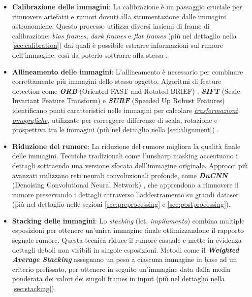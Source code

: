 \begin{itemize}
\item \textbf{Calibrazione delle immagini}: La calibrazione è un passaggio cruciale per rimuovere artefatti e rumori dovuti alla strumentazione dalle immagini astronomiche. Questo processo utilizza diversi insiemi di frame di calibrazione: \textit{bias frames, dark frames} e \textit{flat frames} (più nel dettaglio nella \cref{sec:calibration}) dai quali è possibile estrarre informazioni sul rumore dell'immagine, così da poterlo sottrarre alla stessa \cite{calibration}.

\item \textbf{Allineamento delle immagini}: L'allineamento è necessario per combinare correttamente più immagini dello stesso oggetto. Algoritmi di feature detection come \textit{\textbf{ORB}} (Oriented FAST and Rotated BRIEF) \cite{orb}, \textit{\textbf{SIFT}} (Scale-Invariant Feature Transform) e \textit{\textbf{SURF}} (Speeded Up Robust Features) identificano punti caratteristici nelle immagini per calcolare \hyperref[subsec:homography]{\textit{trasformazioni omografiche}}, utilizzate per correggere differenze di scala, rotazione e prospettiva tra le immagini (più nel dettaglio nella \cref{sec:alignment}) \cite{multiwavelength_image_proc} \cite{improved_solan}.

\item \textbf{Riduzione del rumore}: La riduzione del rumore migliora la qualità finale delle immagini. Tecniche tradizionali come l'unsharp masking \cite{multiwavelength_image_proc} accentuano i dettagli sottraendo una versione sfocata dell'immagine originale. Approcci più avanzati utilizzano reti neurali convoluzionali profonde, come \textit{\textbf{DnCNN}} (Denoising Convolutional Neural Network) \cite{DnCnn}, che apprendono a rimuovere il rumore preservando i dettagli attraverso l'addestramento su grandi dataset (più nel dettaglio nelle sezioni \ref{sec:preprocessing} e \ref{sec:postprocessing}).

\item \textbf{Stacking delle immagini}: Lo \textit{stacking} (let. \textit{impilamento}) combina multiple esposizioni per ottenere un'unica immagine finale ottimizzandone il rapporto segnale-rumore. Questa tecnica riduce il rumore casuale e mette in evidenza dettagli deboli non visibili in singole esposizioni. Metodi come il \textbf{\textit{Weighted Average Stacking}} assegnano un peso a ciascuna immagine in base ad un criterio prefissato, per ottenere in seguito un'immagine data dalla media ponderata dei valori dei singoli frames in input (più nel dettaglio nella \cref{sec:stacking}).
\end{itemize}

